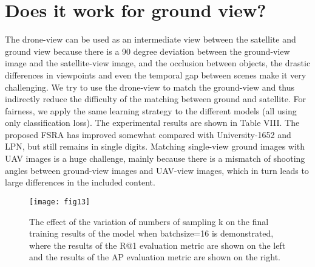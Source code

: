 \documentclass[lettersize,journal]{IEEEtran}
\begin{document}
{\appendices

\begin{table}[h]
\renewcommand\arraystretch{1.5}
\caption{The models were trained on ground, drone and satellite views, and the accuracy of matching between ground and drone views was tested. Where G refers to ground-view and D refers to drone-view.}
\label{table8}
\end{table}

\section{Does it work for ground view?}
The drone-view can be used as an intermediate view between the satellite and ground view because there is a 90 degree deviation between the ground-view image and the satellite-view image, and the occlusion between objects, the drastic differences in viewpoints and even the temporal gap between scenes make it very challenging. We try to use the drone-view to match the ground-view and thus indirectly reduce the difficulty of the matching between ground and satellite. For fairness, we apply the same learning strategy to the different models (all using only classification loss). The experimental results are shown in Table VIII. The proposed FSRA has improved somewhat compared with University-1652 and LPN, but still remains in single digits. Matching single-view ground images with UAV images is a huge challenge, mainly because there is a mismatch of shooting angles between ground-view images and UAV-view images, which in turn leads to large differences in the included content.

\begin{figure}[!t]
\centering
\texttt{[image: fig13]}
\caption{The effect of the variation of numbers of sampling k on the final training results of the model when batchsize=16 is demonstrated, where the results of the R@1 evaluation metric are shown on the left and the results of the AP evaluation metric are shown on the right.}
\label{fig_13}
\end{figure}

}
\end{document}

